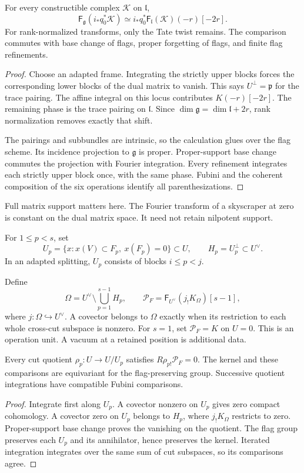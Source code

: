 \begin{proposition}\label{v4-arith:hall:prop:parabolic-fourier}
For every constructible complex $\mathcal K$ on $\mathfrak l$,
\[
 \mathsf F_{\mathfrak g}(i_*q_0^*\mathcal K)
 \simeq i_*q_0^*\mathsf F_{\mathfrak l}(\mathcal K)(-r)[-2r].
\]
For rank-normalized transforms, only the Tate twist remains.
The comparison commutes with base change of flags, proper forgetting
of flags, and finite flag refinements.
\end{proposition}
\begin{proof}
Choose an adapted frame. Integrating the strictly upper blocks
forces the corresponding lower blocks of the dual matrix to vanish.
This says $U^\perp=\mathfrak p$ for the trace pairing.
The affine integral on this locus contributes $K(-r)[-2r]$.
The remaining phase is the trace pairing on $\mathfrak l$.
Since $\dim\mathfrak g=\dim\mathfrak l+2r$, rank normalization
removes exactly that shift.

The pairings and subbundles are intrinsic, so the calculation glues
over the flag scheme. Its incidence projection to $\mathfrak g$
is proper. Proper-support base change commutes the projection with
Fourier integration. Every refinement integrates each strictly upper
block once, with the same phase. Fubini and the coherent composition
of the six operations identify all parenthesizations.
\end{proof}

Full matrix support matters here. The Fourier transform of a
skyscraper at zero is constant on the dual matrix space. It need
not retain nilpotent support.

For $1\leq p<s$, set
\[
 U_p=\{x:x(V)\subset F_p,\ x(F_p)=0\}\subset U,
 \qquad H_p=U_p^\perp\subset U^\vee.
\]
In an adapted splitting, $U_p$ consists of blocks $i\leq p<j$.


Define
\begin{equation}\label{v4-arith:hall:eq:all-cuts}
 \Omega=U^\vee\setminus\bigcup_{p=1}^{s-1}H_p,
 \qquad
 \mathcal P_F=\mathsf F_{U^\vee}(j_!K_\Omega)[s-1],
\end{equation}
where $j:\Omega\hookrightarrow U^\vee$.
A covector belongs to $\Omega$ exactly when its restriction to
each whole cross-cut subspace is nonzero.
For $s=1$, set $\mathcal P_F=K$ on $U=0$.
This is an operation unit. A vacuum at a retained position is
additional data.

\begin{theorem}\label{v4-arith:hall:thm:cut-vanishing}
Every cut quotient $\rho_p:U\to U/U_p$ satisfies
$R\rho_{p!}\mathcal P_F=0$.
The kernel and these comparisons are equivariant for the
flag-preserving group. Successive quotient integrations have
compatible Fubini comparisons.
\end{theorem}
\begin{proof}
Integrate first along $U_p$. A covector nonzero on $U_p$ gives
zero compact cohomology. A covector zero on $U_p$ belongs to
$H_p$, where $j_!K_\Omega$ restricts to zero.
Proper-support base change proves the vanishing on the quotient.
The flag group preserves each $U_p$ and its annihilator, hence
preserves the kernel. Iterated integration integrates over the
same sum of cut subspaces, so its comparisons agree.
\end{proof}


